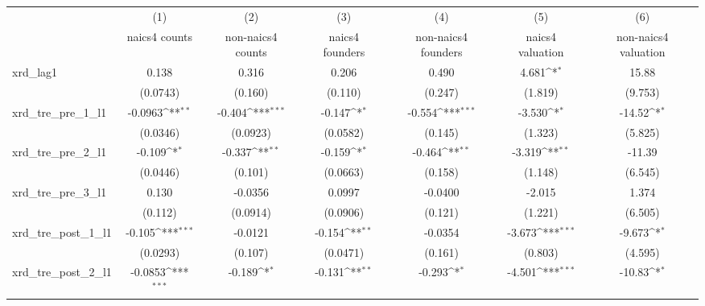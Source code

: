 {
\def\sym#1{\ifmmode^{#1}\else\(^{#1}\)\fi}
\begin{tabular}{l*{6}{c}}
\hline\hline
            &\multicolumn{1}{c}{(1)}&\multicolumn{1}{c}{(2)}&\multicolumn{1}{c}{(3)}&\multicolumn{1}{c}{(4)}&\multicolumn{1}{c}{(5)}&\multicolumn{1}{c}{(6)}\\
            &\multicolumn{1}{c}{naics4 counts}&\multicolumn{1}{c}{non-naics4 counts}&\multicolumn{1}{c}{naics4 founders}&\multicolumn{1}{c}{non-naics4 founders}&\multicolumn{1}{c}{naics4 valuation}&\multicolumn{1}{c}{non-naics4 valuation}\\
\hline
xrd\_lag1    &       0.138         &       0.316         &       0.206         &       0.490         &       4.681\sym{*}  &       15.88         \\
            &    (0.0743)         &     (0.160)         &     (0.110)         &     (0.247)         &     (1.819)         &     (9.753)         \\
[1em]
xrd\_tre\_pre\_1\_l1&     -0.0963\sym{**} &      -0.404\sym{***}&      -0.147\sym{*}  &      -0.554\sym{***}&      -3.530\sym{*}  &      -14.52\sym{*}  \\
            &    (0.0346)         &    (0.0923)         &    (0.0582)         &     (0.145)         &     (1.323)         &     (5.825)         \\
[1em]
xrd\_tre\_pre\_2\_l1&      -0.109\sym{*}  &      -0.337\sym{**} &      -0.159\sym{*}  &      -0.464\sym{**} &      -3.319\sym{**} &      -11.39         \\
            &    (0.0446)         &     (0.101)         &    (0.0663)         &     (0.158)         &     (1.148)         &     (6.545)         \\
[1em]
xrd\_tre\_pre\_3\_l1&       0.130         &     -0.0356         &      0.0997         &     -0.0400         &      -2.015         &       1.374         \\
            &     (0.112)         &    (0.0914)         &    (0.0906)         &     (0.121)         &     (1.221)         &     (6.505)         \\
[1em]
xrd\_tre\_post\_1\_l1&      -0.105\sym{***}&     -0.0121         &      -0.154\sym{**} &     -0.0354         &      -3.673\sym{***}&      -9.673\sym{*}  \\
            &    (0.0293)         &     (0.107)         &    (0.0471)         &     (0.161)         &     (0.803)         &     (4.595)         \\
[1em]
xrd\_tre\_post\_2\_l1&     -0.0853\sym{***}&      -0.189\sym{*}  &      -0.131\sym{**} &      -0.293\sym{*}  &      -4.501\sym{***}&      -10.83\sym{*}  \\

\end{tabular}}
